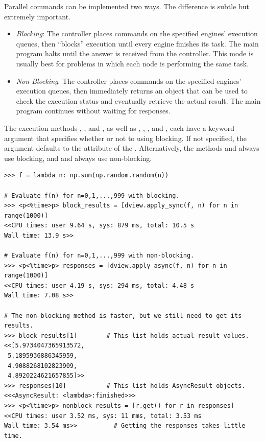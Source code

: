 Parallel commands can be implemented two ways.
The difference is subtle but extremely important.

\begin{itemize}
\item \emph{Blocking}: The controller places commands on the specified engines' execution queues, then ``blocks'' execution until every engine finishes its task.
The main program halts until the answer is received from the controller.
This mode is usually best for problems in which each node is performing the same task.
\item \emph{Non-Blocking}: The controller places commands on the specified engines' execution queues, then immediately returns an  object that can be used to check the execution status and eventually retrieve the actual result.
The main program continues without waiting for responses.
\end{itemize}

The execution methods , , and , as well as , , , and , each have a keyword argument  that specifies whether or not to using blocking.
If not specified, the argument defaults to the  attribute of the .
Alternatively, the methods  and  always use blocking, and  and  always use non-blocking.


\begin{lstlisting}
>>> f = lambda n: np.sum(np.random.random(n))

# Evaluate f(n) for n=0,1,...,999 with blocking.
>>> <p<%time>p> block_results = [dview.apply_sync(f, n) for n in range(1000)]
<<CPU times: user 9.64 s, sys: 879 ms, total: 10.5 s
Wall time: 13.9 s>>

# Evaluate f(n) for n=0,1,...,999 with non-blocking.
>>> <p<%time>p> responses = [dview.apply_async(f, n) for n in range(1000)]
<<CPU times: user 4.19 s, sys: 294 ms, total: 4.48 s
Wall time: 7.08 s>>

# The non-blocking method is faster, but we still need to get its results.
>>> block_results[1]        # This list holds actual result values.
<<[5.9734047365913572,
 5.1895936886345959,
 4.9088268102823909,
 4.8920224621657855]>>
>>> responses[10]           # This list holds AsyncResult objects.
<<<AsyncResult: <lambda>:finished>>>
>>> <p<%time>p> nonblock_results = [r.get() for r in responses]
<<CPU times: user 3.52 ms, sys: 11 mms, total: 3.53 ms
Wall time: 3.54 ms>>          # Getting the responses takes little time.
\end{lstlisting}

